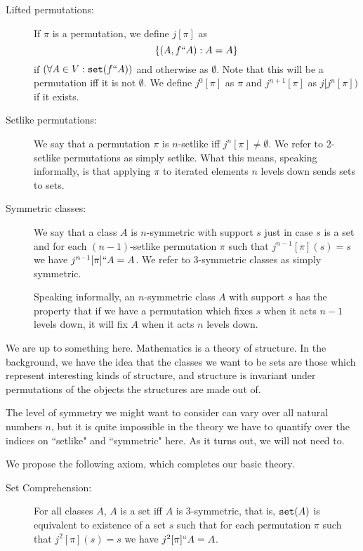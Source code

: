 \documentclass[12pt]{article}
\begin{document}
\begin{description}
\item[Lifted permutations:]  If $\pi$ is a permutation, we define $j[\pi]$ as $$\{(A,f``A):A=A\}$$ if $(\forall A\in V:{\tt set}(f``A))$ and otherwise as $\emptyset$.
Note that this will be a permutation iff it is not $\emptyset$.
We define $j^0[\pi]$ as $\pi$ and $j^{n+1}[\pi]$ as $j[j^n[\pi])$ if it exists.

\item[Setlike permutations:]  We say that a permutation $\pi$ is $n$-setlike iff $j^n[\pi] \neq \emptyset$.  We refer to 2-setlike permutations as simply setlike.  What this means, speaking informally, is that applying $\pi$ to iterated elements $n$ levels down sends sets to sets.

\item[Symmetric classes:]  We say that a class $A$ is $n$-symmetric with support $s$ just in case $s$ is a set and for each $(n-1)$-setlike permutation $\pi$ such
that $j^{n-1}[\pi](s)=s$ we have $j^{n-1}[\pi]``A = A$.  We refer to 3-symmetric classes as simply symmetric.

Speaking informally, an $n$-symmetric class $A$ with support $s$ has the property that if we have a permutation which fixes $s$ when it acts $n-1$ levels down,
it will fix $A$ when it acts $n$ levels down.

\end{description}

We are up to something here.  Mathematics is a theory of structure.  In the background, we have the idea that the classes we want to be sets are those
which represent interesting kinds of structure, and structure is invariant under permutations of the objects the structures are made out of.

The level of symmetry we might want to consider can vary over all natural numbers $n$, but it is quite impossible in the theory we have to quantify over the indices
on ``setlike" and ``symmetric" here.  As it turns out, we will not need to.

We propose the following axiom, which completes our basic theory.

\begin{description}

\item[Set Comprehension:]  For all classes $A$, $A$ is a set iff $A$ is 3-symmetric, that is, ${\tt set}(A)$ is equivalent to existence of a set $s$ such 
that for each permutation $\pi$ such that $j^2[\pi](s)=s$ we have $j^2[\pi]``A=A$.

\end{description}
\end{document}
